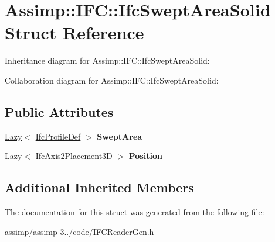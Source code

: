 \hypertarget{struct_assimp_1_1_i_f_c_1_1_ifc_swept_area_solid}{\section{Assimp\+:\+:I\+F\+C\+:\+:Ifc\+Swept\+Area\+Solid Struct Reference}
\label{struct_assimp_1_1_i_f_c_1_1_ifc_swept_area_solid}
}


Inheritance diagram for Assimp\+:\+:I\+F\+C\+:\+:Ifc\+Swept\+Area\+Solid\+:


Collaboration diagram for Assimp\+:\+:I\+F\+C\+:\+:Ifc\+Swept\+Area\+Solid\+:
\subsection*{Public Attributes}
\begin{DoxyCompactItemize}
\item 
\hypertarget{struct_assimp_1_1_i_f_c_1_1_ifc_swept_area_solid_aec3d625b5377ca9879448e2aeb0f7a31}{\hyperlink{struct_assimp_1_1_s_t_e_p_1_1_lazy}{Lazy}$<$ \hyperlink{struct_assimp_1_1_i_f_c_1_1_ifc_profile_def}{Ifc\+Profile\+Def} $>$ {\bfseries Swept\+Area}}\label{struct_assimp_1_1_i_f_c_1_1_ifc_swept_area_solid_aec3d625b5377ca9879448e2aeb0f7a31}

\item 
\hypertarget{struct_assimp_1_1_i_f_c_1_1_ifc_swept_area_solid_af684019d68db1cfaeac0c718405c91c6}{\hyperlink{struct_assimp_1_1_s_t_e_p_1_1_lazy}{Lazy}$<$ \hyperlink{struct_assimp_1_1_i_f_c_1_1_ifc_axis2_placement3_d}{Ifc\+Axis2\+Placement3\+D} $>$ {\bfseries Position}}\label{struct_assimp_1_1_i_f_c_1_1_ifc_swept_area_solid_af684019d68db1cfaeac0c718405c91c6}

\end{DoxyCompactItemize}
\subsection*{Additional Inherited Members}


The documentation for this struct was generated from the following file\+:\begin{DoxyCompactItemize}
\item 
assimp/assimp-\/3../code/I\+F\+C\+Reader\+Gen.\+h\end{DoxyCompactItemize}
